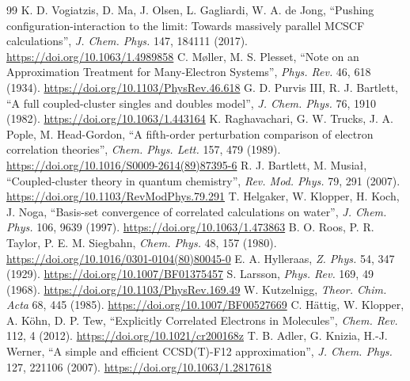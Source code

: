 {\begin{thebibliography}{99}
 K. D. Vogiatzis, D. Ma, J. Olsen, L. Gagliardi, W. A. de Jong, ``Pushing configuration-interaction to the limit: Towards massively parallel MCSCF calculations'', \emph{J. Chem. Phys.} 147, 184111 (2017). \url{https://doi.org/10.1063/1.4989858}
 C. Møller, M. S. Plesset, ``Note on an Approximation Treatment for Many-Electron Systems'', \emph{Phys. Rev.} 46, 618 (1934). \url{https://doi.org/10.1103/PhysRev.46.618}
 G. D. Purvis III, R. J. Bartlett, ``A full coupled-cluster singles and doubles model'', \emph{J. Chem. Phys.} 76, 1910 (1982). \url{https://doi.org/10.1063/1.443164}
 K. Raghavachari, G. W. Trucks, J. A. Pople, M. Head-Gordon, ``A fifth-order perturbation comparison of electron correlation theories'', \emph{Chem. Phys. Lett.} 157, 479 (1989). \url{https://doi.org/10.1016/S0009-2614(89)87395-6}
 R. J. Bartlett, M. Musiał, ``Coupled-cluster theory in quantum chemistry'', \emph{Rev. Mod. Phys.} 79, 291 (2007). \url{https://doi.org/10.1103/RevModPhys.79.291}
 T. Helgaker, W. Klopper, H. Koch, J. Noga, ``Basis-set convergence of correlated calculations on water'', \emph{J. Chem. Phys.} 106, 9639 (1997). \url{https://doi.org/10.1063/1.473863}
 B. O. Roos, P. R. Taylor, P. E. M. Siegbahn, \emph{Chem. Phys.} 48, 157 (1980). \url{https://doi.org/10.1016/0301-0104(80)80045-0}
 E. A. Hylleraas, \emph{Z. Phys.} 54, 347 (1929). \url{https://doi.org/10.1007/BF01375457}
 S. Larsson, \emph{Phys. Rev.} 169, 49 (1968). \url{https://doi.org/10.1103/PhysRev.169.49}
 W. Kutzelnigg, \emph{Theor. Chim. Acta} 68, 445 (1985). \url{https://doi.org/10.1007/BF00527669}
 C. Hättig, W. Klopper, A. Köhn, D. P. Tew, ``Explicitly Correlated Electrons in Molecules'', \emph{Chem. Rev.} 112, 4 (2012). \url{https://doi.org/10.1021/cr200168z}
 T. B. Adler, G. Knizia, H.-J. Werner, ``A simple and efficient CCSD(T)-F12 approximation'', \emph{J. Chem. Phys.} 127, 221106 (2007). \url{https://doi.org/10.1063/1.2817618}


\end{thebibliography}}
